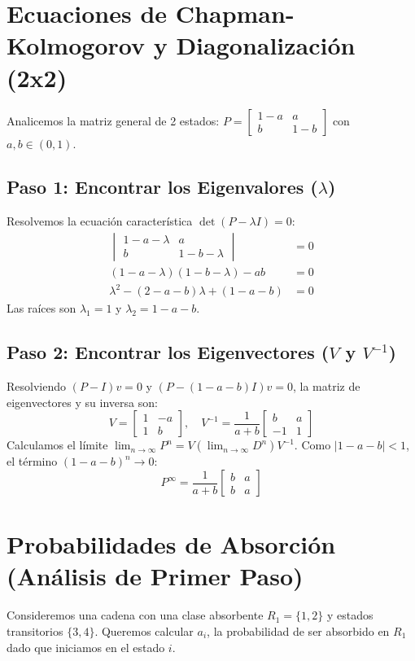 \documentclass[12pt, a4paper]{article}
\begin{document}
\section{Ecuaciones de Chapman-Kolmogorov y Diagonalización (2x2)}
Analicemos la matriz general de 2 estados: $P = \begin{bmatrix} 1-a & a \\ b & 1-b \end{bmatrix}$ con $a,b \in (0,1)$.

\subsection{Paso 1: Encontrar los Eigenvalores ($\lambda$)}
Resolvemos la ecuación característica $\det(P - \lambda I) = 0$:
\begin{align*}
    \begin{vmatrix} 1-a-\lambda & a \\ b & 1-b-\lambda \end{vmatrix} &= 0 \\
    (1-a-\lambda)(1-b-\lambda) - ab &= 0 \\
    \lambda^2 - (2-a-b)\lambda + (1-a-b) &= 0
\end{align*}
Las raíces son $\lambda_1 = 1$ y $\lambda_2 = 1-a-b$.

\subsection{Paso 2: Encontrar los Eigenvectores ($V$ y $V^{-1}$)}
Resolviendo $(P - I)v = 0$ y $(P - (1-a-b)I)v = 0$, la matriz de eigenvectores y su inversa son:
$$ V = \begin{bmatrix} 1 & -a \\ 1 & b \end{bmatrix}, \quad V^{-1} = \frac{1}{a+b} \begin{bmatrix} b & a \\ -1 & 1 \end{bmatrix} $$
Calculamos el límite $\lim_{n \to \infty} P^n = V (\lim_{n \to \infty} D^n) V^{-1}$. Como $|1-a-b| < 1$, el término $(1-a-b)^n \to 0$:
$$ P^\infty = \frac{1}{a+b} \begin{bmatrix} b & a \\ b & a \end{bmatrix} $$

\section{Probabilidades de Absorción (Análisis de Primer Paso)}
Consideremos una cadena con una clase absorbente $R_1 = \{1,2\}$ y estados transitorios $\{3,4\}$. Queremos calcular $a_i$, la probabilidad de ser absorbido en $R_1$ dado que iniciamos en el estado $i$.
\end{document}
